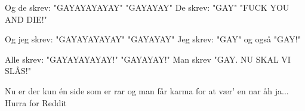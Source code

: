\documentclass[a4paper,11pt]{article}
\begin{document}
\begin{song}
 Og de skrev:
 "GAYAYAYAYAY"
"GAYAYAY"
 De skrev:
 "GAY"
"FUCK YOU AND DIE!"

 Og jeg skrev:
 "GAYAYAYAYAY"
"GAYAYAY"
 Jeg skrev:
 "GAY"
 og også
 "GAY!"

 Alle skrev:
 "GAYAYAYAYAY!"
"GAYAYAY!"
 Man skrev
 "GAY. NU SKAL VI SLÅS!"


Nu er der kun én side som er rar
og man får karma for at vær' en nar
åh ja... 
Hurra for Reddit

\end{song}
\end{document}
